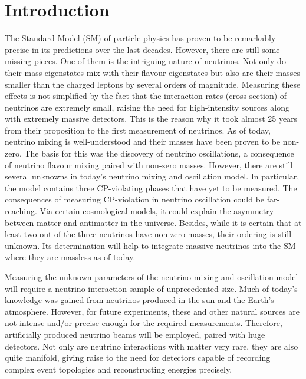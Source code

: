 \chapter{Introduction}
\label{chap:introduction}

The Standard Model (SM) of particle physics has proven to be remarkably precise in its predictions over the last decades.
However, there are still some missing pieces.
One of them is the intriguing nature of neutrinos.
Not only do their mass eigenstates mix with their flavour eigenstates but also are their masses smaller than the charged leptons by several orders of magnitude.
Measuring these effects is not simplified by the fact that the interaction rates (cross-section) of neutrinos are extremely small, raising the need for high-intensity sources along with extremely massive detectors.
This is the reason why it took almost \num{25} years from their proposition to the first measurement of neutrinos.
As of today, neutrino mixing is well-understood and their masses have been proven to be non-zero.
The basis for this was the discovery of neutrino oscillations, a consequence of neutrino flavour mixing paired with non-zero masses.
However, there are still several unknowns in today's neutrino mixing and oscillation model.
In particular, the model contains three CP-violating phases that have yet to be measured.
The consequences of measuring CP-violation in neutrino oscillation could be far-reaching.
Via certain cosmological models, it could explain the asymmetry between matter and antimatter in the universe.
Besides, while it is certain that at least two out of the three neutrinos have non-zero masses, their ordering is still unknown.
Its determination will help to integrate massive neutrinos into the SM where they are massless as of today.

Measuring the unknown parameters of the neutrino mixing and oscillation model will require a neutrino interaction sample of unprecedented size.
Much of today's knowledge was gained from neutrinos produced in the sun and the Earth's atmosphere.
However, for future experiments, these and other natural sources are not intense and/or precise enough for the required measurements.
Therefore, artificially produced neutrino beams will be employed, paired with huge detectors.
Not only are neutrino interactions with matter very rare, they are also quite manifold, giving raise to the need for detectors capable of recording complex event topologies and reconstructing energies precisely.


